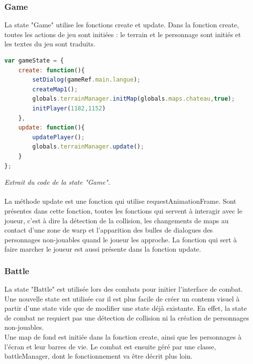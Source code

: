 \documentclass[11pt]{article}
\begin{document}
\subsubsection{Game}
La state "Game" utilise les fonctions create et update. Dans la fonction create, toutes les actions de jeu sont initiées : le terrain et le personnage sont initiés et les textes du jeu sont traduits.
\begin{lstlisting}[language=JavaScript]
var gameState = {
    create: function(){
        setDialog(gameRef.main.langue);
        createMap1();
        globals.terrainManager.initMap(globals.maps.chateau,true);
        initPlayer(1182,1152)
    },
    update: function(){
        updatePlayer();
        globals.terrainManager.update();
    }
};
\end{lstlisting} 
\textit{Extrait du code de la state "Game".}\\\\
La méthode update est une fonction qui utilise requestAnimationFrame. Sont présentes dans cette fonction, toutes les fonctions qui servent à interagir avec le joueur, c'est à dire la détection de la collision, les changements de maps au contact d'une zone de warp et l'apparition des bulles de dialogues des personnages non-jouables quand le joueur les approche. La fonction qui sert à faire marcher le joueur est aussi présente dans la fonction update.
\subsubsection{Battle}
La state "Battle" est utilisée lors des combats pour initier l'interface de combat. Une nouvelle state est utilisée car il est plus facile de créer un contenu visuel à partir d'une state vide que de modifier une state déjà existante. En effet, la state de combat ne requiert pas une détection de collision ni la création de personnages non-jouables.
\\ Une map de fond est initiée dans la fonction create, ainsi que les personnages à l'écran et leur barres de vie. Le combat est ensuite géré par une classe, battleManager, dont le fonctionnement va être décrit plus loin.
\end{document}
